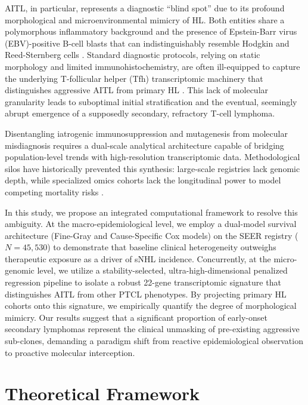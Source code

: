 \documentclass[a4paper,11pt,twocolumn]{article}
\begin{document}
	AITL, in particular, represents a diagnostic ``blind spot'' due to its profound morphological and microenvironmental mimicry of HL. Both entities share a polymorphous inflammatory background and the presence of Epstein-Barr virus (EBV)-positive B-cell blasts that can indistinguishably resemble Hodgkin and Reed-Sternberg cells \cite{Swerdlow2016}. Standard diagnostic protocols, relying on static morphology and limited immunohistochemistry, are often ill-equipped to capture the underlying T-follicular helper (Tfh) transcriptomic machinery that distinguishes aggressive AITL from primary HL \cite{deLeval2007, Swerdlow2016}. This lack of molecular granularity leads to suboptimal initial stratification and the eventual, seemingly abrupt emergence of a supposedly secondary, refractory T-cell lymphoma.
	
	Disentangling iatrogenic immunosuppression and mutagenesis from molecular misdiagnosis requires a dual-scale analytical architecture capable of bridging population-level trends with high-resolution transcriptomic data. Methodological silos have historically prevented this synthesis: large-scale registries lack genomic depth, while specialized omics cohorts lack the longitudinal power to model competing mortality risks \cite{Penberthy2024}. 
	
	In this study, we propose an integrated computational framework to resolve this ambiguity. At the macro-epidemiological level, we employ a dual-model survival architecture (Fine-Gray and Cause-Specific Cox models) on the SEER registry ($N=45,530$) to demonstrate that baseline clinical heterogeneity outweighs therapeutic exposure as a driver of sNHL incidence. Concurrently, at the micro-genomic level, we utilize a stability-selected, ultra-high-dimensional penalized regression pipeline to isolate a robust 22-gene transcriptomic signature that distinguishes AITL from other PTCL phenotypes. By projecting primary HL cohorts onto this signature, we empirically quantify the degree of morphological mimicry. Our results suggest that a significant proportion of early-onset secondary lymphomas represent the clinical unmasking of pre-existing aggressive sub-clones, demanding a paradigm shift from reactive epidemiological observation to proactive molecular interception.
	
	\section{Theoretical Framework}
	
\end{document}
